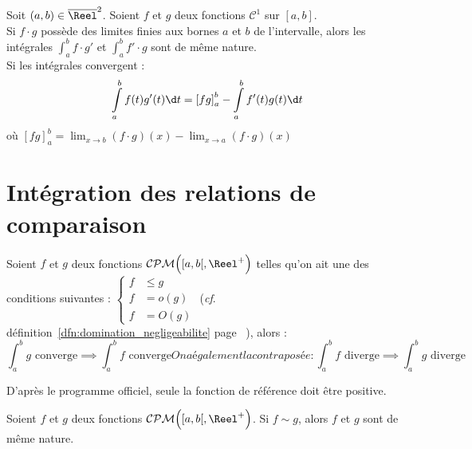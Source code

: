 \documentclass[11pt,a4paper,fleqn,pdftex]{report}
\begin{document}
\begin{itheorem}
     Soit $(a,b)\in \overline{\Reel}^2$. Soient $f$ et $g$ deux fonctions $\mathscr{C}^1$ sur $[a,b]$. \\
     Si $f\cdot g$ possède des limites finies aux bornes $a$ et $b$ de l'intervalle, alors les intégrales $\int_a^b f\cdot g'$ et $\int_a^b f'\cdot g$ sont de même nature.\\
     Si les intégrales convergent : 
     \begin{equation}
     \int \limits_a^b f(t)g'(t)\d t = \left[ fg \right]_a^b - \int \limits_a^b f'(t)g(t)\d t
     \end{equation}
     où $\left[ fg \right]_a^b = \lim_{x\to b} (f\cdot g)(x) - \lim_{x\to a} (f\cdot g)(x) $
\end{itheorem}
\section{Intégration des relations de comparaison} %
\label{sec:integration_des_relations_de_comparaison}
\begin{itheorem}
    Soient $f$ et $g$ deux fonctions $\mathcal{CPM}\Big( [a,b[, \Reel^+ \Big)$ telles qu'on ait une des conditions suivantes : $
    \left\lbrace
    \begin{aligned}
        f &\le g    \\
        f &= o(g)   \\
        f &= O(g)
    \end{aligned}
    \right. $ (\textit{cf}. définition~\ref{dfn:domination_negligeabilite} page~\pageref{dfn:domination_negligeabilite}%
    ), alors :
    \begin{subequations}
    \begin{equation}
     \int_a^b g\text{ converge} \implies \int_a^b f\text{ converge}
    \end{equation}
    On a également la contraposée : 
    \begin{equation}
    \int_a^b f\text{ diverge} \implies \int_a^b g\text{ diverge}
    \end{equation}
    \end{subequations}
\end{itheorem}
 D'après le programme officiel, seule la fonction de référence doit être positive. %
\begin{itheorem}
     Soient $f$ et $g$ deux fonctions $\mathcal{CPM}\Big( [a,b[, \Reel^+ \Big)$. \newline
     Si $f \sim g$, alors $f$ et $g$ sont de même nature.
\end{itheorem}
\end{document}
